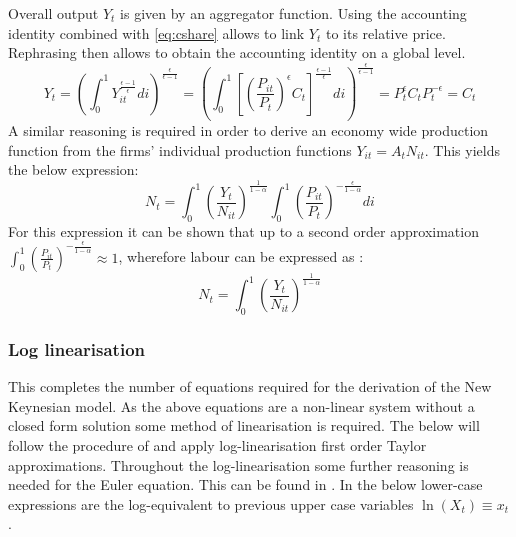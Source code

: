 \documentclass[12pt,a4paper,english]{article} %
\begin{document}
	Overall output $Y_t$ is given by an aggregator function. Using the accounting identity combined with \eqref{eq:cshare} allows to link $Y_t$ to its relative price. Rephrasing then allows to obtain the accounting identity on a global level. 	
	\begin{equation}
			Y_t = 
			\left( 
				\int_{0}^{1} Y_{it}^{\frac{\epsilon - 1}{\epsilon}} di 
			\right)^{\frac{\epsilon}{\epsilon - 1}}
			=
			\left( 
			\int_{0}^{1} 
			\left[
			\left( \frac{P_{it}}{P_t} \right)^\epsilon C_t
			\right]^{\frac{\epsilon - 1}{\epsilon}} di 
			\right)^{\frac{\epsilon}{\epsilon - 1}}
			=
			P_t^{\epsilon} C_t P_t^{-\epsilon}
			=
			C_t
	\end{equation}
	A similar reasoning is required in order to derive an economy wide production function from the firms' individual production functions $Y_{it} = A_t N_{it}$. This yields the below expression:
	\begin{equation}
		N_t = 	
		\int_{0}^{1} \left( \frac{Y_t}{N_{it}} \right)^{\frac{1}{1 - \alpha}}
		\int_{0}^{1} \left( \frac{P_{it}}{P_t} \right)^{-\frac{\epsilon}{1 - \alpha}} di
	\end{equation}
	For this expression it can be shown that up to a second order approximation $\int_{0}^{1} \left( \frac{P_{it}}{P_t} \right)^{-\frac{\epsilon}{1 - \alpha}} \approx 1$, wherefore labour can be expressed as \cite{gali_monetary_2008}:
	\begin{equation}\label{eq: Nt}
		N_t = \int_{0}^{1} \left( \frac{Y_t}{N_{it}} \right)^{\frac{1}{1 - \alpha}}
	\end{equation}
	
	\subsubsection{Log linearisation}
	This completes the number of equations required for the derivation of the New Keynesian model. As the above equations are a non-linear system without a closed form solution some method of linearisation is required. The below will follow the procedure of \cite{gali_monetary_2008} and apply log-linearisation first order Taylor approximations. Throughout the log-linearisation some further reasoning is needed for the Euler equation. This can be found in . In the below lower-case expressions are the log-equivalent to previous upper case variables $\ln(X_t) \equiv x_t$.\\
		
\end{document}
